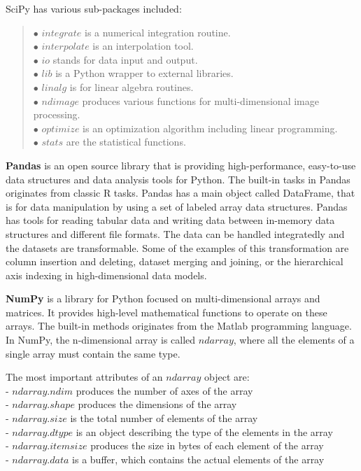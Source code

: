 \noindent SciPy has various sub-packages included:
\begin{verse}
	$\bullet$ $integrate$ is a numerical integration routine.\\
	$\bullet$ $interpolate$ is an interpolation tool.\\
	$\bullet$ $io$ stands for data input and output.\\
	$\bullet$ $lib$ is a Python wrapper to external libraries.\\
	$\bullet$ $linalg$ is for linear algebra routines.\\
	$\bullet$ $ndimage$ produces various functions for multi-dimensional image processing.\\
	$\bullet$ $optimize$ is an optimization algorithm including linear programming.\\
	$\bullet$ $stats$ are the statistical functions.
\end{verse}\bigskip

\textbf{Pandas} is an open source library that is providing high-performance, easy-to-use data structures and data analysis tools for Python. The built-in tasks in Pandas originates from classic R tasks. Pandas has a main object called DataFrame, that is for data manipulation by using a set of labeled array data structures. Pandas has tools for reading tabular data and writing data between in-memory data structures and different file formats. The data can be handled integratedly and the datasets are transformable. Some of the examples of this transformation are column insertion and deleting, dataset merging and joining, or the hierarchical axis indexing in high-dimensional data models.\bigskip


\textbf{NumPy} is a library for Python focused on multi-dimensional arrays and matrices. It provides high-level mathematical functions to operate on these arrays. The built-in methods originates from the Matlab programming language. In NumPy, the n-dimensional array is called $ndarray$, where all the elements of a single array must contain the same type. \medskip

\noindent The most important attributes of an $ndarray$ object are:\\
- $ndarray.ndim$ produces the number of axes of the array\\
- $ndarray.shape$ produces the dimensions of the array\\
- $ndarray.size$ is the total number of elements of the array\\
- $ndarray.dtype$ is an object describing the type of the elements in the array\\
- $ndarray.itemsize$ produces the size in bytes of each element of the array\\
- $ndarray.data$ is a buffer, which contains the actual elements of the array\bigskip


